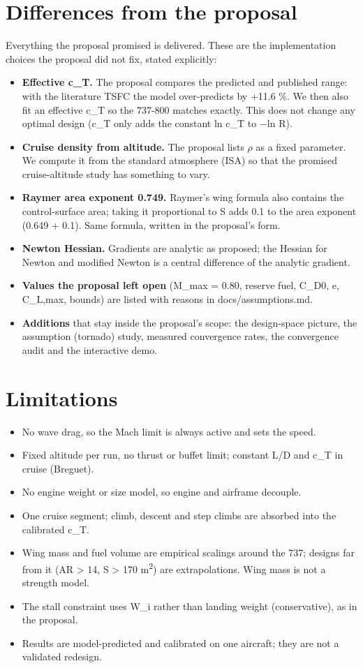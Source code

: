 \documentclass[10pt,a4paper]{article}
\begin{document}
\section{Differences from the proposal}
Everything the proposal promised is delivered. These are the implementation choices the proposal did not fix, stated explicitly:

\begin{itemize}\setlength{\itemsep}{1pt}
\item \textbf{Effective c\_T.} The proposal compares the predicted and published range: with the literature TSFC the model over-predicts by +11.6 \%. We then also fit an effective c\_T so the 737-800 matches exactly. This does not change any optimal design (c\_T only adds the constant ln c\_T to $-$ln R).
\item \textbf{Cruise density from altitude.} The proposal lists $\rho$ as a fixed parameter. We compute it from the standard atmosphere (ISA) so that the promised cruise-altitude study has something to vary.
\item \textbf{Raymer area exponent 0.749.} Raymer's wing formula also contains the control-surface area; taking it proportional to S adds 0.1 to the area exponent (0.649 + 0.1). Same formula, written in the proposal's form.
\item \textbf{Newton Hessian.} Gradients are analytic as proposed; the Hessian for Newton and modified Newton is a central difference of the analytic gradient.
\item \textbf{Values the proposal left open} (M\_max = 0.80, reserve fuel, C\_D0, e, C\_L,max, bounds) are listed with reasons in docs/assumptions.md.
\item \textbf{Additions} that stay inside the proposal's scope: the design-space picture, the assumption (tornado) study, measured convergence rates, the convergence audit and the interactive demo.
\end{itemize}
\section{Limitations}
\begin{itemize}\setlength{\itemsep}{1pt}
\item No wave drag, so the Mach limit is always active and sets the speed.
\item Fixed altitude per run, no thrust or buffet limit; constant L/D and c\_T in cruise (Breguet).
\item No engine weight or size model, so engine and airframe decouple.
\item One cruise segment; climb, descent and step climbs are absorbed into the calibrated c\_T.
\item Wing mass and fuel volume are empirical scalings around the 737; designs far from it (AR > 14, S > 170 m\textsuperscript{2}) are extrapolations. Wing mass is not a strength model.
\item The stall constraint uses W\_i rather than landing weight (conservative), as in the proposal.
\item Results are model-predicted and calibrated on one aircraft; they are not a validated redesign.
\end{itemize}
\end{document}
